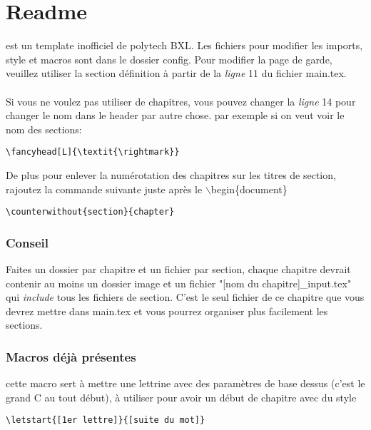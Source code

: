 
\newpage
\section{Readme}

 est un template inofficiel de polytech BXL.
Les fichiers pour modifier les imports, style et macros sont dans le dossier config.
Pour modifier la page de garde, veuillez utiliser la section définition à partir de la \textit{ligne} 11 du fichier main.tex.
\\ \\
Si vous ne voulez pas utiliser de chapitres, vous pouvez changer la \textit{ligne} 14 pour changer le nom dans le header par autre chose. par exemple si on veut voir le nom des sections: \\ 
\begin{lstlisting}[style=latex]
\fancyhead[L]{\textit{\rightmark}}
\end{lstlisting}

\noindent
De plus pour enlever la numérotation des chapitres sur les titres de section, rajoutez la commande suivante juste après le $\backslash$begin\{document\}
\begin{lstlisting}[style=latex]
\counterwithout{section}{chapter}
\end{lstlisting}

\subsubsection{Conseil}
\noindent
Faites un dossier par chapitre et un fichier par section, chaque chapitre devrait contenir au moins un dossier image et un fichier "[nom du chapitre]\_input.tex" qui \textit{include} tous les fichiers de section. C'est le seul fichier de ce chapitre que vous devrez mettre dans main.tex et vous pourrez organiser plus facilement les sections.

\subsubsection{Macros déjà présentes}
\noindent
cette macro sert à mettre une lettrine avec des paramètres de base dessus (c'est le grand C au tout début), à utiliser pour avoir un début de chapitre avec du style
\begin{lstlisting}[style=latex]
\letstart{[1er lettre]}{[suite du mot]}
\end{lstlisting}